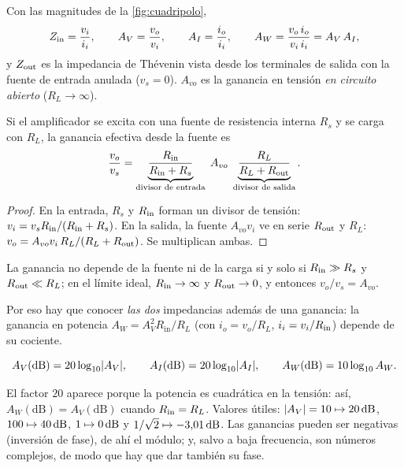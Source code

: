 

\begin{definicion}\label{def:parametros}
Con las magnitudes de la \cref{fig:cuadripolo},
\begin{equation}\label{eq:parametros}
  Z_{\mathrm{in}}=\frac{v_i}{i_i},\qquad
  A_V=\frac{v_o}{v_i},\qquad
  A_I=\frac{i_o}{i_i},\qquad
  A_W=\frac{v_o\,i_o}{v_i\,i_i}=A_V\,A_I ,
\end{equation}
y $Z_{\mathrm{out}}$ es la impedancia de Thévenin vista desde los terminales de salida con la fuente de
entrada anulada ($v_s=0$).
$A_{vo}$ es la ganancia en tensión \emph{en circuito abierto} ($R_L\to\infty$).
\end{definicion}

\begin{proposicion}\label{prop:carga}
Si el amplificador se excita con una fuente de resistencia interna $R_s$ y se carga con $R_L$, la
ganancia efectiva desde la fuente es
\begin{equation}\label{eq:carga}
  \frac{v_o}{v_s}=\underbrace{\frac{R_{\mathrm{in}}}{R_{\mathrm{in}}+R_s}}_{\text{divisor de entrada}}\;A_{vo}\;
                  \underbrace{\frac{R_L}{R_L+R_{\mathrm{out}}}}_{\text{divisor de salida}} .
\end{equation}
\end{proposicion}
\begin{proof}
En la entrada, $R_s$ y $R_{\mathrm{in}}$ forman un divisor de tensión: $v_i=v_sR_{\mathrm{in}}/(R_{\mathrm{in}}+R_s)$. En la salida, la
fuente $A_{vo}v_i$ ve en serie $R_{\mathrm{out}}$ y $R_L$: $v_o=A_{vo}v_i\,R_L/(R_L+R_{\mathrm{out}})$. Se multiplican ambas.
\end{proof}

\begin{corolario}\label{cor:ideal}
La ganancia no depende de la fuente ni de la carga si y solo si $R_{\mathrm{in}}\gg R_s$ y $R_{\mathrm{out}}\ll R_L$; en el
límite ideal, $R_{\mathrm{in}}\to\infty$ y $R_{\mathrm{out}}\to0$, y entonces $v_o/v_s=A_{vo}$.
\end{corolario}

Por eso hay que conocer \emph{las dos} impedancias además de una ganancia: la ganancia en potencia
$A_W=A_V^{2}R_{\mathrm{in}}/R_L$ (con $i_o=v_o/R_L$, $i_i=v_i/R_{\mathrm{in}}$) depende de su cociente.

\begin{definicion}\label{def:dB}
\begin{equation}\label{eq:dB}
  A_V(\mathrm{dB})=20\log_{10}\lvert A_V\rvert,\qquad
  A_I(\mathrm{dB})=20\log_{10}\lvert A_I\rvert,\qquad
  A_W(\mathrm{dB})=10\log_{10}A_W .
\end{equation}
\end{definicion}
El factor $20$ aparece porque la potencia es cuadrática en la tensión: así, $A_W(\mathrm{dB})=A_V(\mathrm{dB})$
cuando $R_{\mathrm{in}}=R_L$. Valores útiles: $\lvert A_V\rvert=10\mapsto20\,\mathrm{dB}$, $100\mapsto40\,\mathrm{dB}$, $1\mapsto0\,\mathrm{dB}$ y
$1/\sqrt2\mapsto-3{,}01\,\mathrm{dB}$. Las ganancias pueden ser negativas (inversión de fase), de ahí el módulo; y,
salvo a baja frecuencia, son números complejos, de modo que hay que dar también su fase.
